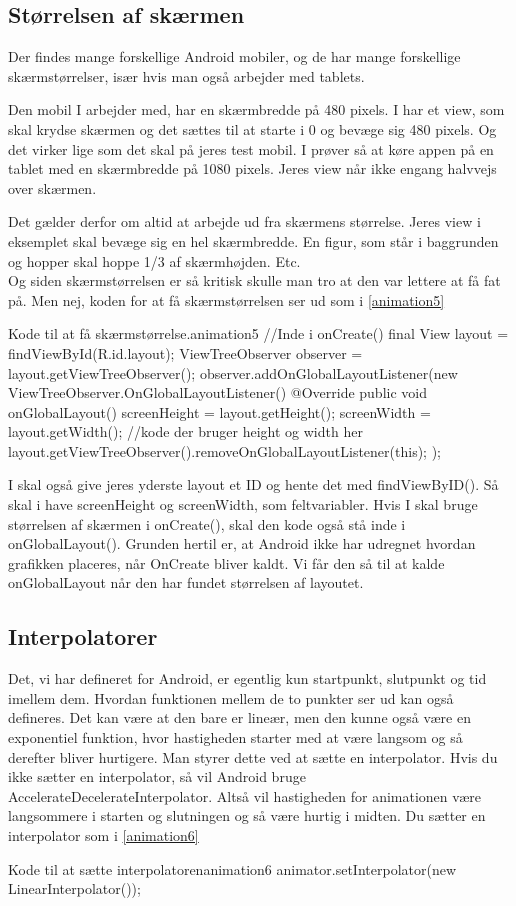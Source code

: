 \subsection{Størrelsen af skærmen}
Der findes mange forskellige Android mobiler, og de har mange forskellige skærmstørrelser, især hvis man også arbejder med tablets. 
\begin{example}
	Den mobil I arbejder med, har en skærmbredde på 480 pixels. I har et view, som skal krydse skærmen og det sættes til at starte i 0 og bevæge sig 480 pixels. Og det virker lige som det skal på jeres test mobil. I prøver så at køre appen på en tablet med en skærmbredde på 1080 pixels. Jeres view når ikke engang halvvejs over skærmen. 
\end{example}
Det gælder derfor om altid at arbejde ud fra skærmens størrelse. Jeres view i eksemplet skal bevæge sig en hel skærmbredde. En figur, som står i baggrunden og hopper skal hoppe 1/3 af skærmhøjden. Etc.\\

Og siden skærmstørrelsen er så kritisk skulle man tro at den var lettere at få fat på. Men nej, koden for at få skærmstørrelsen ser ud som i \autoref{animation5}
\begin{JavaCode}{Kode til at få skærmstørrelse.}{animation5}
	//Inde i onCreate()
	final View layout = findViewById(R.id.layout);
	ViewTreeObserver observer = layout.getViewTreeObserver();
	observer.addOnGlobalLayoutListener(new ViewTreeObserver.OnGlobalLayoutListener() {
		@Override
		public void onGlobalLayout() {
			screenHeight = layout.getHeight();
			screenWidth = layout.getWidth();
			//kode der bruger height og width her
			layout.getViewTreeObserver().removeOnGlobalLayoutListener(this);
		}
	});
\end{JavaCode}

I skal også give jeres yderste layout et ID og hente det med findViewByID(). Så skal i have screenHeight og screenWidth, som feltvariabler. Hvis I skal bruge størrelsen af skærmen i onCreate(), skal den kode også stå inde i onGlobalLayout().
Grunden hertil er, at Android ikke har udregnet hvordan grafikken placeres, når OnCreate bliver kaldt. Vi får den så til at kalde onGlobalLayout når den har fundet størrelsen af layoutet.
\subsection{Interpolatorer}
Det, vi har defineret for Android, er egentlig kun startpunkt, slutpunkt og tid imellem dem. Hvordan funktionen mellem de to punkter ser ud kan også defineres. Det kan være at den bare er lineær, men den kunne også være en exponentiel funktion, hvor hastigheden starter med at være langsom og så derefter bliver hurtigere. Man styrer dette ved at sætte en interpolator. 
Hvis du ikke sætter en interpolator, så vil Android bruge AccelerateDecelerateInterpolator. Altså vil hastigheden for animationen være langsommere i starten og slutningen og så være hurtig i midten. Du sætter en interpolator som i \autoref{animation6}
\begin{JavaCode}{Kode til at sætte interpolatoren}{animation6}
	animator.setInterpolator(new LinearInterpolator());
\end{JavaCode}

